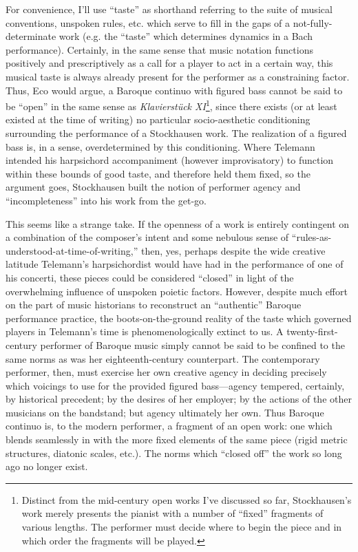     For convenience, I'll use ``taste'' as shorthand referring to the suite of musical conventions, unspoken rules, etc. which serve to fill in the gaps of a not-fully-determinate work (e.g. the ``taste'' which determines dynamics in a Bach performance). Certainly, in the same sense that music notation functions positively and prescriptively as a call for a player to act in a certain way, this musical taste is always already present for the performer as a constraining factor. Thus, Eco would argue, a Baroque continuo with figured bass cannot be said to be ``open'' in the same sense as \textit{Klavierstück XI}\footnote{Distinct from the mid-century open works I've discussed so far, Stockhausen's work merely presents the pianist with a number of ``fixed'' fragments of various lengths. The performer must decide where to begin the piece and in which order the fragments will be played.}, since there exists (or at least existed at the time of writing) no particular socio-aesthetic conditioning surrounding the performance of a Stockhausen work. The realization of a figured bass is, in a sense, overdetermined by this conditioning. Where Telemann intended his harpsichord accompaniment (however improvisatory) to function within these bounds of good taste, and therefore held them fixed, so the argument goes, Stockhausen built the notion of performer agency and ``incompleteness'' into his work from the get-go.

    This seems like a strange take. If the openness of a work is entirely contingent on a combination of the composer's intent and some nebulous sense of ``rules-as-understood-at-time-of-writing,'' then, yes, perhaps despite the wide creative latitude Telemann's harpsichordist would have had in the performance of one of his concerti, these pieces could be considered ``closed'' in light of the overwhelming influence of unspoken poietic factors. However, despite much effort on the part of music historians to reconstruct an ``authentic'' Baroque performance practice, the boots-on-the-ground reality of the taste which governed players in Telemann's time is phenomenologically extinct to us. A twenty-first-century performer of Baroque music simply cannot be said to be confined to the same norms as was her eighteenth-century counterpart. The contemporary performer, then, must exercise her own creative agency in deciding precisely which voicings to use for the provided figured bass---agency tempered, certainly, by historical precedent; by the desires of her employer; by the actions of the other musicians on the bandstand; but agency ultimately her own. Thus Baroque continuo is, to the modern performer, a fragment of an open work: one which blends seamlessly in with the more fixed elements of the same piece (rigid metric structures, diatonic scales, etc.). The norms which ``closed off'' the work so long ago no longer exist.

